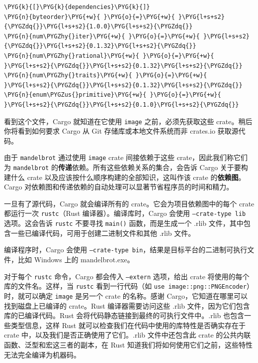 \begin{Verbatim}[commandchars=\\\{\},breaklines=true,breakanywhere=true,fontsize=\codefont,xleftmargin=17bp]
\PYG{k}{[}\PYG{k}{dependencies}\PYG{k}{]}
\PYG{n}{byteorder}\PYG{+w}{ }\PYG{o}{=}\PYG{+w}{ }\PYG{l+s+s2}{\PYGZdq{}}\PYG{l+s+s2}{1.0.0}\PYG{l+s+s2}{\PYGZdq{}}
\PYG{n}{num\PYGZhy{}iter}\PYG{+w}{ }\PYG{o}{=}\PYG{+w}{ }\PYG{l+s+s2}{\PYGZdq{}}\PYG{l+s+s2}{0.1.32}\PYG{l+s+s2}{\PYGZdq{}}
\PYG{n}{num\PYGZhy{}rational}\PYG{+w}{ }\PYG{o}{=}\PYG{+w}{ }\PYG{l+s+s2}{\PYGZdq{}}\PYG{l+s+s2}{0.1.32}\PYG{l+s+s2}{\PYGZdq{}}
\PYG{n}{num\PYGZhy{}traits}\PYG{+w}{ }\PYG{o}{=}\PYG{+w}{ }\PYG{l+s+s2}{\PYGZdq{}}\PYG{l+s+s2}{0.1.32}\PYG{l+s+s2}{\PYGZdq{}}
\PYG{n}{enum\PYGZus{}primitive}\PYG{+w}{ }\PYG{o}{=}\PYG{+w}{ }\PYG{l+s+s2}{\PYGZdq{}}\PYG{l+s+s2}{0.1.0}\PYG{l+s+s2}{\PYGZdq{}}
\end{Verbatim}

看到这个文件，Cargo 就知道在它使用 \texttt{image} 之前，必须先获取这些 crate。稍后你将看到如何要求 Cargo 从 Git 存储库或本地文件系统而非 crates.io 获取源代码。

由于 \texttt{mandelbrot} 通过使用 \texttt{image} crate 间接依赖于这些 crate，因此我们称它们为 \texttt{mandelbrot} 的\textbf{传递}依赖。所有这些依赖关系的集合，会告诉 Cargo 关于要构建什么 crate 以及应该按什么顺序构建的全部知识，这叫作该 crate 的\textbf{依赖图}。Cargo 对依赖图和传递依赖的自动处理可以显著节省程序员的时间和精力。

一旦有了源代码，Cargo 就会编译所有的 crate。它会为项目依赖图中的每个 crate 都运行一次 \texttt{rustc}（Rust 编译器）。编译库时，Cargo 会使用 \texttt{--crate-type lib} 选项。这会告诉 \texttt{rustc} 不要寻找 \texttt{main()} 函数，而是生成一个 .rlib 文件，其中包含一些已编译代码，可用于创建二进制文件和其他 .rlib 文件。

编译程序时，Cargo 会使用 \texttt{--crate-type bin}，结果是目标平台的二进制可执行文件，比如 Windows 上的 mandelbrot.exe。

对于每个 \texttt{rustc} 命令，Cargo 都会传入 \texttt{--extern} 选项，给出 crate 将使用的每个库的文件名。这样，当 \texttt{rustc} 看到一行代码（如 \texttt{use image::png::PNGEncoder}）时，就可以确定 \texttt{image} 是另一个 crate 的名称。感谢 Cargo，它知道在哪里可以找到磁盘上已编译的 crate。Rust 编译器需要访问这些 .rlib 文件，因为它们包含库的已编译代码。Rust 会将代码静态链接到最终的可执行文件中。.rlib 也包含一些类型信息，这样 Rust 就可以检查我们在代码中使用的库特性是否确实存在于 crate 中，以及我们是否正确使用了它们。.rlib 文件中还包含此 crate 的公共内联函数、泛型和宏这三者的副本，在 Rust 知道我们将如何使用它们之前，这些特性无法完全编译为机器码。

